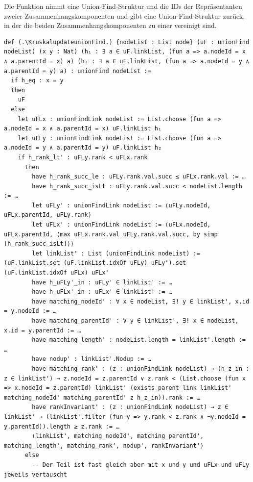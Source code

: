 \begin{definition}[\KruskalupdateunionFind]\label{KruskalupdateunionFind}
  Die Funktion nimmt eine Union-Find-Struk\-tur und die IDs der Repräsentanten zweier Zusammenhangskomponenten und gibt eine Union-Find-Struktur zurück,
  in der die beiden Zusammenhangskomponenten zu einer vereinigt sind.
\end{definition}
\newpage
\begin{lstlisting}
def (.\KruskalupdateunionFind.) {nodeList : List node} (uF : unionFind nodeList) (x y : Nat) (h₁ : ∃ a ∈ uF.linkList, (fun a => a.nodeId = x ∧ a.parentId = x) a) (h₂ : ∃ a ∈ uF.linkList, (fun a => a.nodeId = y ∧ a.parentId = y) a) : unionFind nodeList :=
  if h_eq : x = y
  then
    uF
  else
    let uFLx : unionFindLink nodeList := List.choose (fun a => a.nodeId = x ∧ a.parentId = x) uF.linkList h₁
    let uFLy : unionFindLink nodeList := List.choose (fun a => a.nodeId = y ∧ a.parentId = y) uF.linkList h₂
    if h_rank_lt' : uFLy.rank < uFLx.rank
      then
        have h_rank_succ_le : uFLy.rank.val.succ ≤ uFLx.rank.val := …
        have h_rank_succ_isLt : uFLy.rank.val.succ < nodeList.length := …
        let uFLy' : unionFindLink nodeList := ⟨uFLy.nodeId, uFLx.parentId, uFLy.rank⟩
        let uFLx' : unionFindLink nodeList := ⟨uFLx.nodeId, uFLx.parentId, ⟨max uFLx.rank.val uFLy.rank.val.succ, by simp [h_rank_succ_isLt]⟩⟩
        let linkList' : List (unionFindLink nodeList) := (uF.linkList.set (uF.linkList.idxOf uFLy) uFLy').set (uF.linkList.idxOf uFLx) uFLx'
        have h_uFLy'_in : uFLy' ∈ linkList' := …
        have h_uFLx'_in : uFLx' ∈ linkList' := …
        have matching_nodeId' : ∀ x ∈ nodeList, ∃! y ∈ linkList', x.id = y.nodeId := …
        have matching_parentId' : ∀ y ∈ linkList', ∃! x ∈ nodeList, x.id = y.parentId := …
        have matching_length' : nodeList.length = linkList'.length := …
        have nodup' : linkList'.Nodup := …
        have matching_rank' : (z : unionFindLink nodeList) → (h_z_in : z ∈ linkList') → z.nodeId = z.parentId ∨ z.rank < (List.choose (fun x => x.nodeId = z.parentId) linkList' (exists_parent_link linkList' matching_nodeId' matching_parentId' z h_z_in)).rank := …
        have rankInvariant' : (z : unionFindLink nodeList) → z ∈ linkList' → (linkList'.filter (fun y => y.rank < z.rank ∧ ¬y.nodeId = y.parentId)).length ≥ z.rank := …
        ⟨linkList', matching_nodeId', matching_parentId', matching_length', matching_rank', nodup', rankInvariant'⟩
      else
        -- Der Teil ist fast gleich aber mit x und y und uFLx und uFLy jeweils vertauscht
\end{lstlisting}

